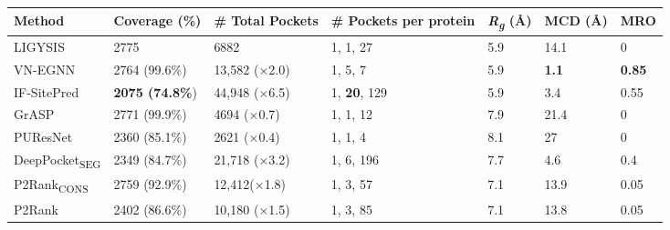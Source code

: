 \begin{landscape}
\begin{longtable}[c]{|M{28mm}|M{29mm}|M{29mm}|M{41mm}|M{26mm}|M{26mm}|M{20mm}|}
\hline
\textbf{Method}        & \textbf{Coverage} (\%)    & \textbf{\# Total Pockets}  & \textbf{\# Pockets per protein} & \textbf{\textit{R\textsubscript{g}}} (\AA{}) & \textbf{MCD} (\AA{}) & \textbf{MRO}  \\ \hline
\endfirsthead
%
\endhead
%
LIGYSIS       & 2775          & 6882          & 1, 1, 27            & 5.9                              & 14.1                         & 0    \\ \hline
VN-EGNN       & 2764 (99.6\%)   & 13,582 ($\times$2.0) & 1, 5, 7             & 5.9                              & \textbf{1.1}                          & \textbf{0.85} \\ \hline
IF-SitePred   & \textbf{2075 (74.8\%}) & 44,948 ($\times$6.5) & 1, \textbf{20}, 129          & 5.9                              & 3.4                          & 0.55 \\ \hline
GrASP         & 2771 (99.9\%) & 4694 ($\times$0.7)  & 1, 1, 12            & 7.9                              & 21.4                         & 0    \\ \hline
PUResNet      & 2360 (85.1\%) & 2621 ($\times$0.4)  & 1, 1, 4             & 8.1                              & 27                           & 0    \\ \hline
DeepPocket\textsubscript{SEG} & 2349 (84.7\%) & 21,718 ($\times$3.2) & 1, 6, 196           & 7.7                              & 4.6                          & 0.4  \\ \hline
P2Rank\textsubscript{CONS}    & 2759 (92.9\%) & 12,412($\times$1.8)  & 1, 3, 57            & 7.1                              & 13.9                         & 0.05 \\ \hline
P2Rank        & 2402 (86.6\%) & 10,180 ($\times$1.5) & 1, 3, 85            & 7.1                              & 13.8                         & 0.05 \\ \hline

\end{longtable}
\end{landscape}
